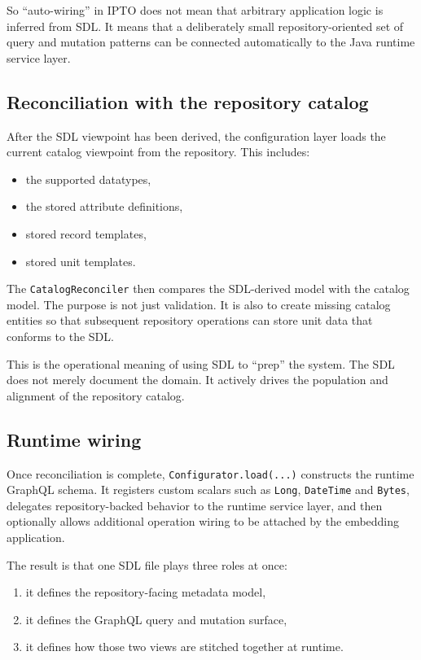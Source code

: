 So ``auto-wiring'' in IPTO does not mean that arbitrary application logic is inferred from SDL. It means that a deliberately small repository-oriented set of query and mutation patterns can be connected automatically to the Java runtime service layer.

\subsection{Reconciliation with the repository catalog}

After the SDL viewpoint has been derived, the configuration layer loads the current catalog viewpoint from the repository. This includes:
\begin{itemize}
\item the supported datatypes,
\item the stored attribute definitions,
\item stored record templates,
\item stored unit templates.
\end{itemize}

The \texttt{CatalogReconciler} then compares the SDL-derived model with the catalog model. The purpose is not just validation. It is also to create missing catalog entities so that subsequent repository operations can store unit data that conforms to the SDL.

This is the operational meaning of using SDL to ``prep'' the system. The SDL does not merely document the domain. It actively drives the population and alignment of the repository catalog.

\subsection{Runtime wiring}

Once reconciliation is complete, \texttt{Configurator.load(...)} constructs the runtime GraphQL schema. It registers custom scalars such as \texttt{Long}, \texttt{DateTime} and \texttt{Bytes}, delegates repository-backed behavior to the runtime service layer, and then optionally allows additional operation wiring to be attached by the embedding application.

The result is that one SDL file plays three roles at once:
\begin{enumerate}
\item it defines the repository-facing metadata model,
\item it defines the GraphQL query and mutation surface,
\item it defines how those two views are stitched together at runtime.
\end{enumerate}

